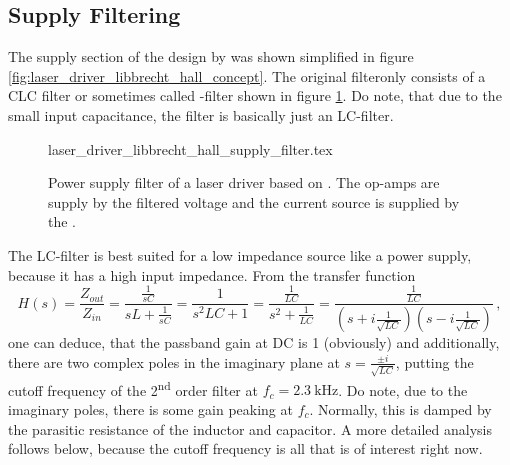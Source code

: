 \clearpage
\subsection{Supply Filtering}
The supply section of the design by \citeauthor{libbrecht_hall} was shown simplified in figure \ref{fig:laser_driver_libbrecht_hall_concept}. The original filteronly consists of a CLC filter or sometimes called \pi-filter shown in figure \ref{fig:laser_driver_libbrecht_hall_filter}. Do note, that due to the small input capacitance, the filter is basically just an LC-filter.

\begin{figure}[ht]
    \centering
        {laser_driver_libbrecht_hall_supply_filter.tex}
    \caption{Power supply filter of a laser driver based on \cite{libbrecht_hall}. The op-amps are supply by the filtered voltage and the current source is supplied by the .}
    \label{fig:laser_driver_libbrecht_hall_filter}
\end{figure}

The LC-filter is best suited for a low impedance source like a power supply, because it has a high input impedance. From the transfer function
\begin{equation}
    H(s) = \frac{Z_{out}}{Z_{in}} = \frac{\frac{1}{sC}}{sL + \frac{1}{sC}} = \frac{1}{s^2LC +1} = \frac{\frac{1}{LC}}{s^2 + \frac{1}{LC}} = \frac{\frac{1}{LC}}{\left(s+i\frac{1}{\sqrt{LC}}\right)\left(s-i\frac{1}{\sqrt{LC}}\right)}\,, \label{eqn:transfer_function_lc_filter}
\end{equation}
one can deduce, that the passband gain at DC is \num{1} (obviously) and additionally, there are two complex poles in the imaginary plane at $s = \frac{\pm i}{\sqrt{LC}}$, putting the cutoff frequency of the 2\textsuperscript{nd} order filter at $f_c = \qty{2.3}{\kHz}$. Do note, due to the imaginary poles, there is some gain peaking at $f_c$. Normally, this is damped by the parasitic resistance of the inductor and capacitor. A more detailed analysis follows below, because the cutoff frequency is all that is of interest right now.

